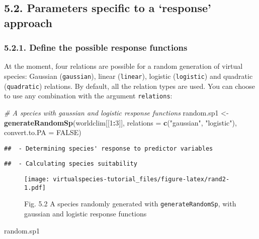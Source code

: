 \documentclass[]{article}
\newenvironment{Shaded}{\begin{snugshade}}{\end{snugshade}}
\newcommand{\KeywordTok}[1]{\textcolor[rgb]{0.13,0.29,0.53}{\textbf{#1}}}
\newcommand{\DataTypeTok}[1]{\textcolor[rgb]{0.13,0.29,0.53}{#1}}
\newcommand{\DecValTok}[1]{\textcolor[rgb]{0.00,0.00,0.81}{#1}}
\newcommand{\StringTok}[1]{\textcolor[rgb]{0.31,0.60,0.02}{#1}}
\newcommand{\CommentTok}[1]{\textcolor[rgb]{0.56,0.35,0.01}{\textit{#1}}}
\newcommand{\OtherTok}[1]{\textcolor[rgb]{0.56,0.35,0.01}{#1}}
\newcommand{\OperatorTok}[1]{\textcolor[rgb]{0.81,0.36,0.00}{\textbf{#1}}}
\newcommand{\NormalTok}[1]{#1}
\begin{document}
\subsection{\texorpdfstring{5.2. Parameters specific to a `response'
approach}{5.2. Parameters specific to a response approach}}\label{parameters-specific-to-a-response-approach}

\subsubsection{5.2.1. Define the possible response
functions}\label{define-the-possible-response-functions}

At the moment, four relations are possible for a random generation of
virtual species: Gaussian (\texttt{gaussian}), linear (\texttt{linear}),
logistic (\texttt{logistic}) and quadratic (\texttt{quadratic})
relations. By default, all the relation types are used. You can choose
to use any combination with the argument \texttt{relations}:

\begin{Shaded}
\begin{Highlighting}[]
\CommentTok{# A species with gaussian and logistic response functions}
\NormalTok{random.sp1 <-}\StringTok{ }\KeywordTok{generateRandomSp}\NormalTok{(worldclim[[}\DecValTok{1}\OperatorTok{:}\DecValTok{3}\NormalTok{]], }
                              \DataTypeTok{relations =} \KeywordTok{c}\NormalTok{(}\StringTok{"gaussian"}\NormalTok{, }\StringTok{"logistic"}\NormalTok{),}
                              \DataTypeTok{convert.to.PA =} \OtherTok{FALSE}\NormalTok{)}
\end{Highlighting}
\end{Shaded}

\begin{verbatim}
##  - Determining species' response to predictor variables
\end{verbatim}

\begin{verbatim}
##  - Calculating species suitability
\end{verbatim}

\begin{figure}
\centering
\texttt{[image: virtualspecies-tutorial\_files/figure-latex/rand2-1.pdf]}
\caption{Fig. 5.2 A species randomly generated with
\texttt{generateRandomSp}, with gaussian and logistic response
functions}
\end{figure}

\begin{Shaded}
\begin{Highlighting}[]
\NormalTok{random.sp1}
\end{Highlighting}
\end{Shaded}
\end{document}
